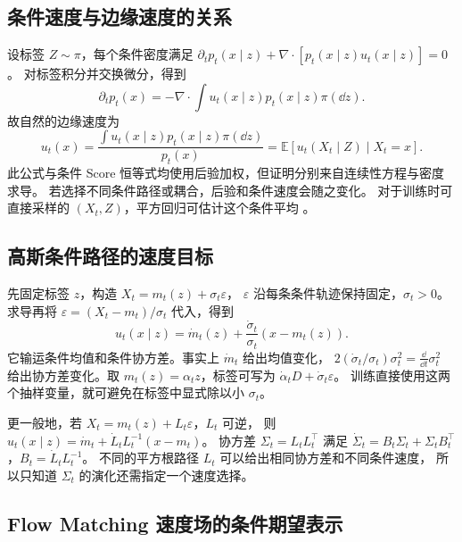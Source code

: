 \subsection{条件速度与边缘速度的关系}

设标签 \(Z\sim\pi\)，每个条件密度满足
\(\partial_t p_t(x\mid z)+\nabla\cdot[p_t(x\mid z)u_t(x\mid z)]=0\)。
对标签积分并交换微分，得到
\[
 \partial_t p_t(x)=-\nabla\cdot\int u_t(x\mid z)p_t(x\mid z)\pi(\dd z).
\]
故自然的边缘速度为
\begin{equation}
 u_t(x)=\frac{\int u_t(x\mid z)p_t(x\mid z)\pi(\dd z)}{p_t(x)}
       =\mathbb E[u_t(X_t\mid Z)\mid X_t=x].
 \label{eq:fields-conditional-velocity}
\end{equation}
此公式与条件 Score 恒等式均使用后验加权，但证明分别来自连续性方程与密度求导。
若选择不同条件路径或耦合，后验和条件速度会随之变化。
对于训练时可直接采样的 \((X_t,Z)\)，平方回归可估计这个条件平均
\cite{lipman2023fm}。

\subsection{高斯条件路径的速度目标\requiredderivation}

先固定标签 \(z\)，构造 \(X_t=m_t(z)+\sigma_t\varepsilon\)，
\(\varepsilon\) 沿每条条件轨迹保持固定，\(\sigma_t>0\)。
求导再将 \(\varepsilon=(X_t-m_t)/\sigma_t\) 代入，得到
\begin{equation}
 u_t(x\mid z)=\dot m_t(z)+\frac{\dot\sigma_t}{\sigma_t}(x-m_t(z)).
 \label{eq:fields-gaussian-conditional-velocity}
\end{equation}
它输运条件均值和条件协方差。事实上 \(\dot m_t\) 给出均值变化，
\(2(\dot\sigma_t/\sigma_t)\sigma_t^2=\frac{\dd}{\dd t}\sigma_t^2\)
给出协方差变化。取 \(m_t(z)=\alpha_tz\)，标签可写为
\(\dot\alpha_tD+\dot\sigma_t\varepsilon\)。
训练直接使用这两个抽样变量，就可避免在标签中显式除以小 \(\sigma_t\)。

更一般地，若 \(X_t=m_t(z)+L_t\varepsilon\)，\(L_t\) 可逆，
则 \(u_t(x\mid z)=\dot m_t+\dot L_tL_t^{-1}(x-m_t)\)。
协方差 \(\Sigma_t=L_tL_t^\top\) 满足
\(\dot\Sigma_t=B_t\Sigma_t+\Sigma_tB_t^\top\)，\(B_t=\dot L_tL_t^{-1}\)。
不同的平方根路径 \(L_t\) 可以给出相同协方差和不同条件速度，
所以只知道 \(\Sigma_t\) 的演化还需指定一个速度选择。

\subsection{Flow Matching 速度场的条件期望表示}

